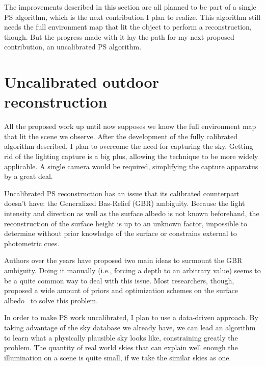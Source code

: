The improvements described in this section are all planned to be part of a single PS algorithm, which is the next contribution I plan to realize. This algorithm still needs the full environment map that lit the object to perform a reconstruction, though. But the progress made with it lay the path for my next proposed contribution, an uncalibrated PS algorithm.

\section{Uncalibrated outdoor reconstruction}
\label{sec:uncalib}

All the proposed work up until now supposes we know the full environment map that lit the scene we observe. After the development of the fully calibrated algorithm described, I plan to overcome the need for capturing the sky. Getting rid of the lighting capture is a big plus, allowing the technique to be more widely applicable. A single camera would be required, simplifying the capture apparatus by a great deal.

Uncalibrated PS reconstruction has an issue that its calibrated counterpart doesn't have: the Generalized Bas-Relief (GBR) ambiguity. Because the light intensity and direction as well as the surface albedo is not known beforehand, the reconstruction of the surface height is up to an unknown factor, impossible to determine without prior knowledge of the surface or constrains external to photometric cues.

Authors over the years have proposed two main ideas to surmount the GBR ambiguity. Doing it manually (i.e., forcing a depth to an arbitrary value) seems to be a quite common way to deal with this issue. Most researchers, though, proposed a wide amount of priors and optimization schemes on the surface albedo~\cite{tan-cvpr-07,alldrin-cvpr-08,abrams-eccv-12,queau-jmiv-14} to solve this problem.

In order to make PS work uncalibrated, I plan to use a data-driven approach. By taking advantage of the sky database we already have, we can lead an algorithm to learn what a physically plausible sky looks like, constraining greatly the problem. The quantity of real world skies that can explain well enough the illumination on a scene is quite small, if we take the similar skies as one. 

